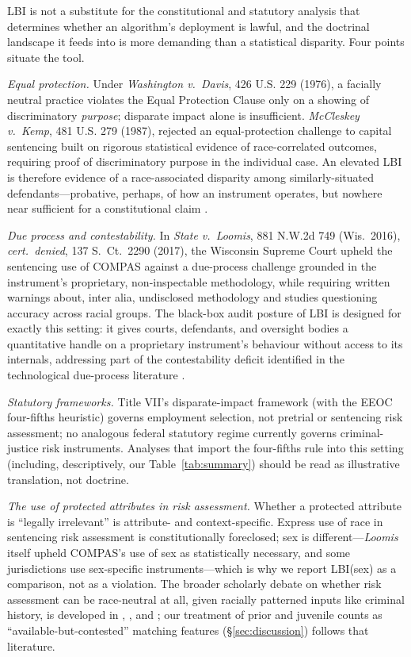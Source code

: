 \documentclass[11pt]{article}
\begin{document}
LBI is not a substitute for the constitutional and statutory
analysis that determines whether an algorithm's deployment is
lawful, and the doctrinal landscape it feeds into is more demanding
than a statistical disparity. Four points situate the tool.

\emph{Equal protection.} Under \emph{Washington v.\ Davis}, 426 U.S.
229 (1976), a facially neutral practice violates the Equal Protection
Clause only on a showing of discriminatory \emph{purpose}; disparate
impact alone is insufficient. \emph{McCleskey v.\ Kemp}, 481 U.S. 279
(1987), rejected an equal-protection challenge to capital sentencing
built on rigorous statistical evidence of race-correlated outcomes,
requiring proof of discriminatory purpose in the individual case. An
elevated LBI is therefore evidence of a race-associated disparity
among similarly-situated defendants---probative, perhaps, of how an
instrument operates, but nowhere near sufficient for a
constitutional claim \citep{huq2019}.

\emph{Due process and contestability.} In \emph{State v.\ Loomis},
881 N.W.2d 749 (Wis.\ 2016), \emph{cert.\ denied}, 137 S.\ Ct.\ 2290
(2017), the Wisconsin Supreme Court upheld the sentencing use of
COMPAS against a due-process challenge grounded in the instrument's
proprietary, non-inspectable methodology, while requiring written
warnings about, inter alia, undisclosed methodology and studies
questioning accuracy across racial groups. The black-box audit
posture of LBI is designed for exactly this setting: it gives courts,
defendants, and oversight bodies a quantitative handle on a
proprietary instrument's behaviour without access to its internals,
addressing part of the contestability deficit identified in the
technological due-process literature \citep{citron2008}.

\emph{Statutory frameworks.} Title VII's disparate-impact framework
(with the EEOC four-fifths heuristic) governs employment selection,
not pretrial or sentencing risk assessment; no analogous federal
statutory regime currently governs criminal-justice risk
instruments. Analyses that import the four-fifths rule into this
setting (including, descriptively, our Table~\ref{tab:summary})
should be read as illustrative translation, not doctrine.

\emph{The use of protected attributes in risk assessment.} Whether a
protected attribute is ``legally irrelevant'' is attribute- and
context-specific. Express use of race in sentencing risk assessment
is constitutionally foreclosed; sex is different---\emph{Loomis}
itself upheld COMPAS's use of sex as statistically necessary, and
some jurisdictions use sex-specific instruments---which is why we
report LBI(sex) as a comparison, not as a violation. The broader
scholarly debate on whether risk assessment can be race-neutral at
all, given racially patterned inputs like criminal history, is
developed in \citet{starr2014}, \citet{mayson2019}, and
\citet{huq2019}; our treatment of prior and juvenile counts as
``available-but-contested'' matching features
(\S\ref{sec:discussion}) follows that literature.
\end{document}

